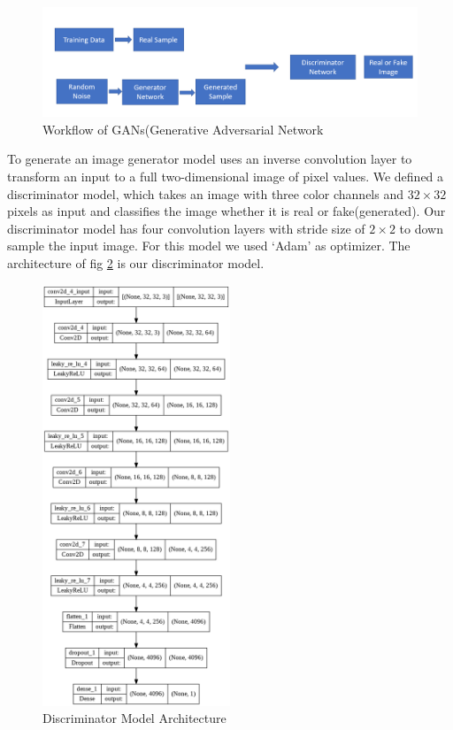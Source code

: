 \documentclass{article}
\begin{document}
\begin{figure}[H]
    \centering
    \includegraphics[width=\textwidth]{Generator workflow.PNG}
    \caption{ Workflow of GANs(Generative Adversarial Network}
    \label{fig:compute}
\end{figure}



To generate an image generator model uses an inverse convolution layer to transform an input to a full two-dimensional image of pixel values. We defined a discriminator model, which takes an image with three color channels and $32\times32$ pixels as input and classifies the image whether it is real or fake(generated). Our discriminator model has four convolution layers with stride size of $2\times2$ to down sample the input image. For this model we used ‘Adam’ as optimizer. The architecture of fig \ref{fig:compute1} is our discriminator model.  

\begin{figure}[H]
    \centering
    \includegraphics[width=0.5\textwidth]{d_model.png}
    \caption{ Discriminator Model Architecture}
    \label{fig:compute1}
\end{figure}
\end{document}
